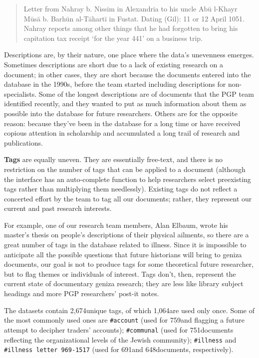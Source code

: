 \documentclass{article}
\def\uniqueTags{2,674}
\def\taggedAccount{759}
\def\taggedCommunal{751}
\def\taggedIllness{691}
\def\taggedIllnessLetter{648}
\def\singletonTags{1,064}
\begin{document}
\begin{quote}
Letter from Nahray b. Nissim in Alexandria to his uncle Abū l-Khayr Mūsā b. Barhūn al-Tāhartī in Fustat. Dating (Gil): 11 or 12 April 1051. Nahray reports among other things that he had forgotten to bring his capitation tax receipt ‘for the year 441’ on a business trip. \autocite{noauthor_letter_1050}
\end{quote}
Descriptions are, by their nature, one place where the data’s unevenness emerges. Sometimes descriptions are short due to a lack of existing research on a document; in other cases, they are short because the documents entered into the database in the 1990s, before the team started including descriptions for non-specialists. Some of the longest descriptions are of documents that the PGP team identified recently, and they wanted to put as much information about them as possible into the database for future researchers. Others are for the opposite reason: because they’ve been in the database for a long time or have received copious attention in scholarship and accumulated a long trail of research and publications. 

\textbf{Tags} are equally uneven. They are essentially free-text, and there is no restriction on the number of tags that can be applied to a document (although the interface has an auto-complete function to help researchers select preexisting tags rather than multiplying them needlessly). Existing tags do not reflect a concerted effort by the team to tag all our documents; rather, they represent our current and past research interests. 

For example, one of our research team members, Alan Elbaum, wrote his master’s thesis on people’s descriptions of their physical ailments, so there are a great number of tags in the database related to illness. Since it is impossible to anticipate all the possible questions that future historians will bring to geniza documents, our goal is not to produce tags for some theoretical future researcher, but to flag themes or individuals of interest. Tags don’t, then, represent the current state of documentary geniza research; they are less like library subject headings and more PGP researchers’ post-it notes.

The datasets contain \uniqueTags\space unique tags, of which \singletonTags\space are used only once. Some of the most commonly used ones are \texttt{\#account} (used for \taggedAccount\space and flagging a future attempt to decipher traders’ accounts); \texttt{\#communal} (used for \taggedCommunal\space documents reflecting the organizational levels of the Jewish community); \texttt{\#illness} and \texttt{\#illness letter 969-1517}  (used for \taggedIllness\space and \taggedIllnessLetter\space documents, respectively). 
\end{document}
